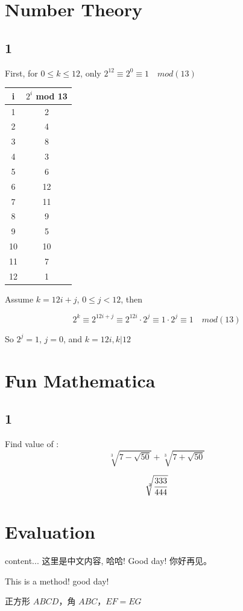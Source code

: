\documentclass[11pt,a4paper]{article}
\begin{document}
\section{Number Theory}
\subsection{1}
First, for $0 \le k \le 12$, only $2^{12} \equiv 2^0 \equiv 1 \quad mod(13)$ 



\begin{tabular}{c|c}
	\hline
	\hline i & $2^i$ mod 13\\
	\hline
	 1&2 \\
	 2&4 \\
	 3&8 \\
	 4&3 \\
	 5&6 \\
	 6&12 \\
	 7&11 \\
	 8&9 \\
	 9&5 \\
	 10&10 \\
	 11&7 \\
	 12&1 \\
	
	\hline
\end{tabular}

Assume $k=12i+j$, $0 \le j < 12$, then

$$2^k \equiv 2^{12i+j} \equiv 2^{12i} \cdot 2^j \equiv 1\cdot 2^j \equiv 1 \quad mod(13)$$

So $2^j=1$, $j=0$, and $k=12i, k|12$

\section{Fun Mathematica}
\subsection{1}
Find value of : $$\sqrt[3]{7-\sqrt{50}} + \sqrt[3]{7+\sqrt{50}}$$

$$\sqrt[\leftroot{-3}\uproot{-3}3]{\dfrac{333}{444}}$$

\section{Evaluation}
\begin{CJK}{UTF8}{gbsn}
	content...
这里是中文内容, 哈哈! Good day!
你好\citep{abley2006operation}再见。

This is a method! good\citep{wang2010research} day!

正方形 $\mathit{ABCD}$，角 $\mathit{ABC}$，$\mathit{EF} = \mathit{EG}$

\end{CJK}
\end{document}

